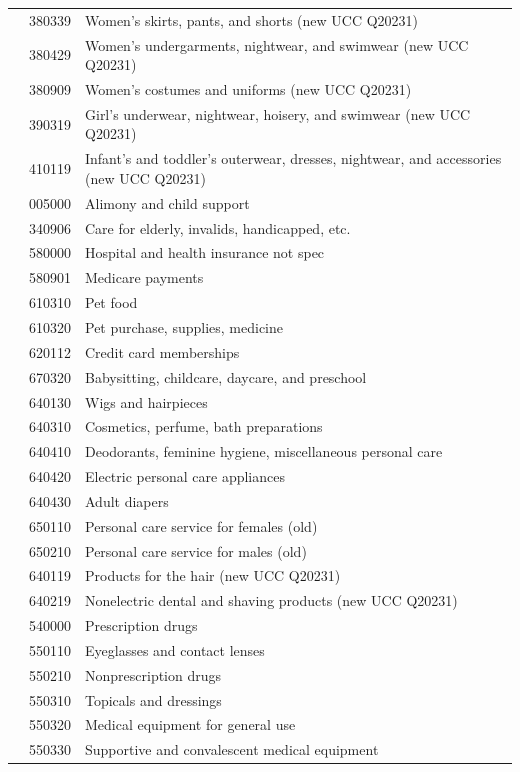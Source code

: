 \documentclass[
]{agujournal2019}
\begin{document}
\begin{table}
{\begin{tabular*}{\linewidth}{@{\extracolsep{\fill}}l|rl}
 & 380339 & Women's skirts, pants, and shorts (new UCC Q20231) \\ 
 & 380429 & Women's undergarments, nightwear, and swimwear (new UCC Q20231) \\ 
 & 380909 & Women's costumes and uniforms (new UCC Q20231) \\ 
 & 390319 & Girl's underwear, nightwear, hoisery, and swimwear (new UCC Q20231) \\ 
 & 410119 & Infant's and toddler's outerwear, dresses, nightwear, and accessories (new UCC Q20231) \\ 
 & 005000 & Alimony and child support \\ 
 & 340906 & Care for elderly, invalids, handicapped, etc. \\ 
 & 580000 & Hospital and health insurance not spec \\ 
 & 580901 & Medicare payments \\ 
 & 610310 & Pet food \\ 
 & 610320 & Pet purchase, supplies, medicine \\ 
 & 620112 & Credit card memberships \\ 
 & 670320 & Babysitting, childcare, daycare, and preschool \\ 
 & 640130 & Wigs and hairpieces \\ 
 & 640310 & Cosmetics, perfume, bath preparations \\ 
 & 640410 & Deodorants, feminine hygiene, miscellaneous personal care \\ 
 & 640420 & Electric personal care appliances \\ 
 & 640430 & Adult diapers \\ 
 & 650110 & Personal care service for females (old) \\ 
 & 650210 & Personal care service for males (old) \\ 
 & 640119 & Products for the hair (new UCC Q20231) \\ 
 & 640219 & Nonelectric dental and shaving products (new UCC Q20231) \\ 
 & 540000 & Prescription drugs \\ 
 & 550110 & Eyeglasses and contact lenses \\ 
 & 550210 & Nonprescription drugs \\ 
 & 550310 & Topicals and dressings \\ 
 & 550320 & Medical equipment for general use \\ 
 & 550330 & Supportive and convalescent medical equipment \\ 

\end{tabular*}}
\end{table}
\end{document}
